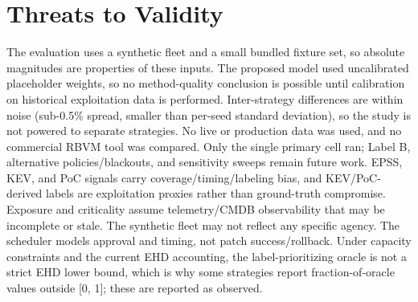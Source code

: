 \section{Threats to Validity}

The evaluation uses a synthetic fleet and a small bundled fixture set, so absolute
magnitudes are properties of these inputs. The proposed model used uncalibrated
placeholder weights, so no method-quality conclusion is possible until calibration
on historical exploitation data is performed. Inter-strategy differences are within
noise (sub-0.5\% spread, smaller than per-seed standard deviation), so the study is
not powered to separate strategies. No live or production data was used, and no
commercial RBVM tool was compared. Only the single primary cell ran; Label B,
alternative policies/blackouts, and sensitivity sweeps remain future work. EPSS,
KEV, and PoC signals carry coverage/timing/labeling bias, and KEV/PoC-derived
labels are exploitation proxies rather than ground-truth compromise. Exposure and
criticality assume telemetry/CMDB observability that may be incomplete or stale.
The synthetic fleet may not reflect any specific agency. The scheduler models
approval and timing, not patch success/rollback. Under capacity constraints and the
current EHD accounting, the label-prioritizing oracle is not a strict EHD lower
bound, which is why some strategies report fraction-of-oracle values outside [0, 1];
these are reported as observed.
